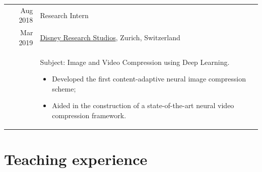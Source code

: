 \documentclass[a4paper,11pt]{article}
\def\datespace{-2pt}
\def\title-main-sep{4pt}
\def\tabwidth{13cm}
\begin{document}
\begin{tabular}{r|p{\tabwidth}}
      {\small Aug 2018} & Research Intern \\[\datespace]
      {\small Mar 2019} &  {\small \href{https://studios.disneyresearch.com/}{Disney Research Studios}, Zurich, Switzerland}\\[\title-main-sep]
			& {
        \parbox[t]{\tabwidth}{
        \footnotesize Subject: Image and Video Compression using Deep Learning.
        \begin{itemize}[topsep=0pt, partopsep=0pt, parsep=0pt, itemsep=0pt, leftmargin=*, after=\vspace{0pt}]
          \item Developed the first content-adaptive neural image compression scheme;
          \item Aided in the construction of a state-of-the-art neural video compression framework.
        \end{itemize}
        }
      }
    \end{tabular}

  

  \vspace{15pt}

  \section{Teaching experience}
\end{document}
